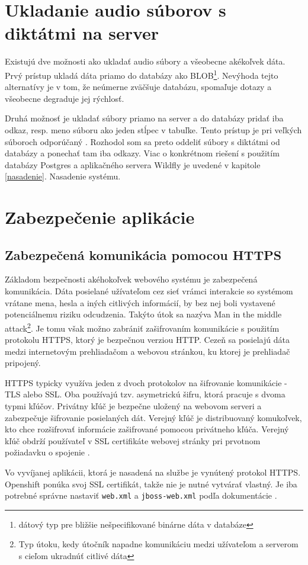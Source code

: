 \documentclass[12pt,oneside]{fithesis2}
\begin{document}
	\section{Ukladanie audio súborov s diktátmi na server} \label{ukladanie}
      \par Existujú dve možnosti ako ukladať audio súbory a všeobecne akékoľvek dáta. Prvý prístup ukladá dáta priamo do databázy ako BLOB\footnote{dátový typ pre bližšie nešpecifikované binárne dáta v databáze}. Nevýhoda tejto alternatívy je v tom, že neúmerne zväčšuje databázu, spomaľuje dotazy a všeobecne degraduje jej rýchlosť.
      \par Druhá možnosť je ukladať súbory priamo na server a do databázy pridať iba odkaz, resp. meno súboru ako jeden stĺpec v tabuľke. Tento prístup je pri veľkých súboroch odporúčaný \cite{sof1}. Rozhodol som sa preto oddeliť súbory s diktátmi od databázy a ponechať tam iba odkazy. Viac o konkrétnom riešení s použitím databázy Postgres a aplikačného servera Wildfly je uvedené v kapitole \ref{nasadenie}. Nasadenie systému.
     
      \section{Zabezpečenie aplikácie}
      		\subsection{Zabezpečená komunikácia pomocou HTTPS} \label{https}
      		\par Základom bezpečnosti akéhokoľvek webového systému je zabezpečená komunikácia. Dáta posielané užívateľom cez sieť vrámci interakcie so systémom vrátane mena, hesla a iných citlivých informácií, by bez nej boli vystavené potenciálnemu riziku odcudzenia. Takýto útok sa nazýva Man in the middle attack\footnote{Typ útoku, kedy útočník napadne komunikáciu medzi užívateľom a serverom s cieľom ukradnúť citlivé dáta}. Je tomu však možno zabrániť zašifrovaním komunikácie s použitím protokolu HTTPS, ktorý je bezpečnou verziou HTTP. Cezeň sa posielajú dáta medzi internetovým prehliadačom a webovou stránkou, ku ktorej je prehliadač pripojený. 
      		\par HTTPS typicky využíva jeden z dvoch protokolov na šifrovanie komunikácie - TLS alebo SSL. Oba používajú tzv. asymetrickú šifru, ktorá pracuje s dvoma typmi kľúčov. Privátny kľúč je bezpečne uložený na webovom serveri a zabezpečuje šifrovanie posielaných dát. Verejný kľúč je distribuovaný komukoľvek, kto chce rozšifrovať informácie zašifrované pomocou privátneho kľúča. Verejný kľúč obdrží používateľ v SSL certifikáte webovej stránky pri prvotnom požiadavku o spojenie \cite{comodo15}.
      		\par Vo vyvíjanej aplikácii, ktorá je nasadená na službe je vynútený protokol HTTPS. Openshift ponúka svoj SSL certifikát, takže nie je nutné vytvárať vlastný. Je iba potrebné správne nastaviť \texttt{web.xml} a \texttt{jboss-web.xml} podľa dokumentácie \cite{openshift15}.
      		\pagebreak
\end{document}
